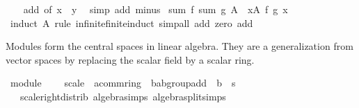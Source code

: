 \begin{isabellebody}
%
\isadelimproof
\ \ %
\endisadelimproof
%
\isatagproof
{}\isamarkupfalse%
\ add\ {\isacharbrackleft}{\kern0pt}of\ x\ {\isachardoublequoteopen}{\isacharminus}{\kern0pt}\ y{\isachardoublequoteclose}{\isacharbrackright}{\kern0pt}\ \isamarkupfalse%
\ {\isacharparenleft}{\kern0pt}simp\ add{\isacharcolon}{\kern0pt}\ minus{\isacharparenright}{\kern0pt}%
\endisatagproof
{\isafoldproof}%
%
\isadelimproof
\isanewline
%
\endisadelimproof
\isanewline
{}\isamarkupfalse%
\ sum{\isacharcolon}{\kern0pt}\ {\isachardoublequoteopen}f\ {\isacharparenleft}{\kern0pt}sum\ g\ A{\isacharparenright}{\kern0pt}\ {\isacharequal}{\kern0pt}\ {\isacharparenleft}{\kern0pt}{\isasymSum}x{\isasymin}A{\isachardot}{\kern0pt}\ f\ {\isacharparenleft}{\kern0pt}g\ x{\isacharparenright}{\kern0pt}{\isacharparenright}{\kern0pt}{\isachardoublequoteclose}\isanewline
%
\isadelimproof
\ \ %
\endisadelimproof
%
\isatagproof
{}\isamarkupfalse%
\ {\isacharparenleft}{\kern0pt}induct\ A\ rule{\isacharcolon}{\kern0pt}\ infinite{\isacharunderscore}{\kern0pt}finite{\isacharunderscore}{\kern0pt}induct{\isacharparenright}{\kern0pt}\ {\isacharparenleft}{\kern0pt}simp{\isacharunderscore}{\kern0pt}all\ add{\isacharcolon}{\kern0pt}\ zero\ add{\isacharparenright}{\kern0pt}%
\endisatagproof
{\isafoldproof}%
%
\isadelimproof
\isanewline
%
\endisadelimproof
\isanewline
{}\isamarkupfalse%
%
\begin{isamarkuptext}%
Modules form the central spaces in linear algebra. They are a generalization from vector
spaces by replacing the scalar field by a scalar ring.%
\end{isamarkuptext}\isamarkuptrue%
\isamarkupfalse%
\ module\ {\isacharequal}{\kern0pt}\isanewline
\ \ \ scale\ {\isacharcolon}{\kern0pt}{\isacharcolon}{\kern0pt}\ {\isachardoublequoteopen}{\isacharprime}{\kern0pt}a{\isacharcolon}{\kern0pt}{\isacharcolon}{\kern0pt}comm{\isacharunderscore}{\kern0pt}ring{\isacharunderscore}{\kern0pt}{}\ {\isasymRightarrow}\ {\isacharprime}{\kern0pt}b{\isacharcolon}{\kern0pt}{\isacharcolon}{\kern0pt}ab{\isacharunderscore}{\kern0pt}group{\isacharunderscore}{\kern0pt}add\ {\isasymRightarrow}\ {\isacharprime}{\kern0pt}b{\isachardoublequoteclose}\ {\isacharparenleft}{\kern0pt}\ {\isachardoublequoteopen}{\isacharasterisk}{\kern0pt}s{\isachardoublequoteclose}\ {}{}{\isacharparenright}{\kern0pt}\isanewline
\ \ \ scale{\isacharunderscore}{\kern0pt}right{\isacharunderscore}{\kern0pt}distrib\ {\isacharbrackleft}{\kern0pt}algebra{\isacharunderscore}{\kern0pt}simps{\isacharcomma}{\kern0pt}\ algebra{\isacharunderscore}{\kern0pt}split{\isacharunderscore}{\kern0pt}simps{\isacharbrackright}{\kern0pt}{\isacharcolon}{\kern0pt}\isanewline

\end{isabellebody}
